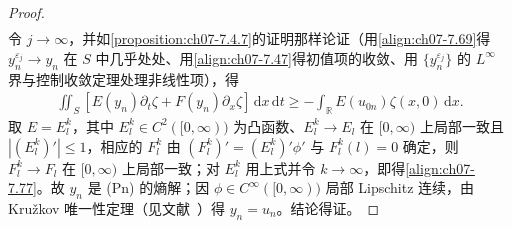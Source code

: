\documentclass[../../main.tex]{subfiles}%
\begin{document}
\begin{proof}
\begin{align*}
\end{align*}
令 $j\to\infty$，并如\cref{proposition:ch07-7.4.7}的证明那样论证（用\eqref{align:ch07-7.69}得 $y_n^{\varepsilon_j}\to y_n$ 在 $S$ 中几乎处处、用\eqref{align:ch07-7.47}得初值项的收敛、用 $\{y_n^{\varepsilon_j}\}$ 的 $L^\infty$ 界与控制收敛定理处理非线性项），得
\begin{align*}
\iint_S[E(y_n)\partial_t\zeta+F(y_n)\partial_x\zeta]\,\mathrm{d}x\,\mathrm{d}t\geqslant-\int_\mathbb{R}E(u_{0n})\zeta(x,0)\,\mathrm{d}x .
\end{align*}
取 $E=E_l^k$，其中 $E_l^k\in C^2([0,\infty))$ 为凸函数、$E_l^k\to E_l$ 在 $[0,\infty)$ 上局部一致且 $|(E_l^k)'|\leqslant1$，相应的 $F_l^k$ 由 $(F_l^k)'=(E_l^k)'\phi'$ 与 $F_l^k(l)=0$ 确定，则 $F_l^k\to F_l$ 在 $[0,\infty)$ 上局部一致；对 $E_l^k$ 用上式并令 $k\to\infty$，即得\eqref{align:ch07-7.77}。故 $y_n$ 是 (Pn) 的熵解；因 $\phi\in C^\infty([0,\infty))$ 局部 Lipschitz 连续，由 Kružkov 唯一性定理（见文献~\cite{ref91}）得 $y_n=u_n$。结论得证。
\end{proof}
\end{document}
